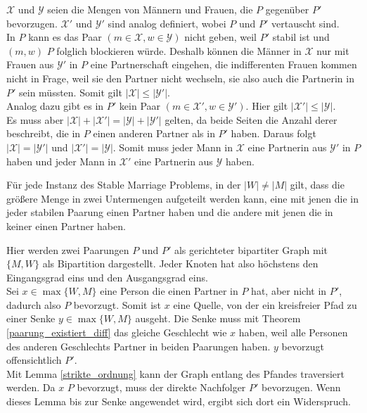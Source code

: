 \begin{Beweis}
\label{strikte_ordnung_bew}
  $\mathcal{X}$ und $\mathcal{Y}$ seien die Mengen von Männern und Frauen, die $P$ gegenüber $P'$ bevorzugen. $\mathcal{X'}$ und $\mathcal{Y'}$ sind analog definiert, wobei $P$ und $P'$ vertauscht sind.\\
  In $P$ kann es das Paar $(m \in \mathcal{X},w \in \mathcal{Y})$ nicht geben, weil $P'$ stabil ist und $(m,w)$ $P$ folglich blockieren würde. Deshalb können die Männer in $\mathcal{X}$ nur mit Frauen aus $\mathcal{Y'}$ in $P$ eine Partnerschaft eingehen, die indifferenten Frauen kommen nicht in Frage, weil sie den Partner nicht wechseln, sie also auch die Partnerin in $P'$ sein müssten. Somit gilt $|\mathcal{X}| \leq |\mathcal{Y'}|$.\\
  Analog dazu gibt es in $P'$ kein Paar $(m \in \mathcal{X'},w \in \mathcal{Y'})$. Hier gilt $|\mathcal{X'}| \leq |\mathcal{Y}|$.\\
  Es muss aber $|\mathcal{X}| + |\mathcal{X'}| = |\mathcal{Y}| + |\mathcal{Y'}|$ gelten, da beide Seiten die Anzahl derer beschreibt, die in $P$ einen anderen Partner als in $P'$ haben. Daraus folgt $|\mathcal{X}| = |\mathcal{Y'}|$ und $|\mathcal{X'}| = |\mathcal{Y}|$. Somit muss jeder Mann in $\mathcal{X}$ eine Partnerin aus $\mathcal{Y'}$ in $P$ haben und jeder Mann in $\mathcal{X'}$ eine Partnerin aus $\mathcal{Y}$ haben.
\end{Beweis}

\begin{Theorem}
\label{partner_oder_nicht_diff}
  Für jede Instanz des Stable Marriage Problems, in der $|W| \neq |M|$ gilt, dass die größere Menge in zwei Untermengen aufgeteilt werden kann, eine mit jenen die in jeder stabilen Paarung einen Partner haben und die andere mit jenen die in keiner einen Partner haben.
\end{Theorem}

\begin{Beweis}
\label{partner_oder_nicht_diff_bew}
  Hier werden zwei Paarungen $P$ und $P'$ als gerichteter bipartiter Graph mit $\{M,W\}$ als Bipartition dargestellt. Jeder Knoten hat also höchstens den Eingangsgrad eins und den Ausgangsgrad eins.\\
  Sei $x \in \max\{W,M\}$ eine Person die einen Partner in $P$ hat, aber nicht in $P'$, dadurch also $P$ bevorzugt. Somit ist $x$ eine Quelle, von der ein kreisfreier Pfad zu einer Senke $y \in \max\{W,M\}$ ausgeht. Die Senke muss mit Theorem \ref{paarung_existiert_diff} das gleiche Geschlecht wie $x$ haben, weil alle Personen des anderen Geschlechts Partner in beiden Paarungen haben. $y$ bevorzugt offensichtlich $P'$.\\
  Mit Lemma \ref{strikte_ordnung} kann der Graph entlang des Pfandes traversiert werden. Da $x$ $P$ bevorzugt, muss der direkte Nachfolger $P'$ bevorzugen. Wenn dieses Lemma bis zur Senke angewendet wird, ergibt sich dort ein Widerspruch.
\end{Beweis}

